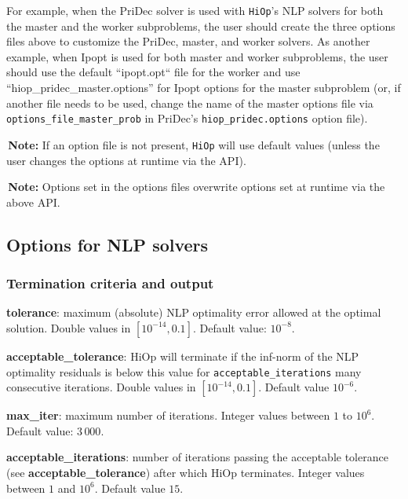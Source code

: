 \documentclass[11pt]{article}
\newcommand{\warningSymbol}{\raisebox{0.9\depth}{\danger}}
\newcommand{\warningcp}[1]{%
        \smallskip \noindent \textcolor{warningColorText}{\warningSymbol{}}\,\textbf{#1} %
    }
\newcommand{\Hi}{\texttt{HiOp}\xspace}
\begin{document}
For example, when the PriDec solver is used with \Hi's NLP solvers for both the master and the worker subproblems, the user should create the three options files above to customize the PriDec, master, and worker solvers. As another example, when Ipopt is used for both master and worker subproblems, the user should use the default ``ipopt.opt`` file for the worker and use ``hiop\_pridec\_master.options'' for Ipopt options for the master subproblem (or, if another file needs to be used, change the name of the master options file via \texttt{options\_file\_master\_prob} in PriDec's \texttt{hiop\_pridec.options} option file).

\warningcp{Note:} If an option file is not present, \Hi will use default values (unless the user changes the options at runtime via the API).

\warningcp{Note:} Options set in the options files overwrite options set at runtime via the above API.

\subsection{Options for NLP solvers}

\subsubsection{Termination criteria and output}

\noindent \textbf{tolerance}: maximum (absolute)  NLP optimality error allowed at the optimal solution. Double values in $[10^{-14},0.1]$. Default value: $10^{-8}$. 

\medskip

\noindent \textbf{acceptable\_tolerance}: HiOp will terminate if the inf-norm of the NLP optimality residuals is below this value for \texttt{acceptable\_iterations} many consecutive iterations. 
Double values in $[10^{-14},0.1]$. Default value $10^{-6}$.

\medskip

\noindent \textbf{max\_iter}: maximum number of iterations. Integer values between $1$ to $10^6$. Default value: $3\,000$.

\medskip

\noindent \textbf{acceptable\_iterations}: number of iterations passing the acceptable tolerance (see \textbf{acceptable\_tolerance}) after which HiOp terminates. Integer values between $1$ and $10^6$. Default value $15$.

\medskip
\end{document}
